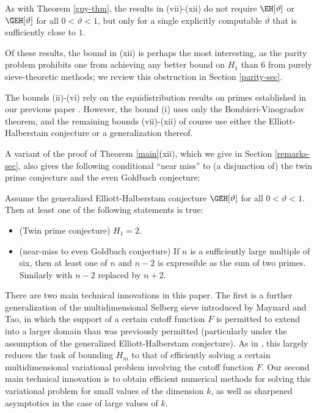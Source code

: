 As with Theorem \ref{gpy-thm}, the results in (vii)-(xii) do not require $\EH[\vartheta]$ or $\GEH[\vartheta]$ for all $0 < \vartheta < 1$, but only for a single explicitly computable $\vartheta$ that is sufficiently close to $1$.

Of these results, the bound in (xii) is perhaps the most interesting, as the parity problem \cite{selberg} prohibits one from achieving any better bound on $H_1$ than $6$ from purely sieve-theoretic methods; we review this obstruction in Section \ref{parity-sec}.

The bounds (ii)-(vi) rely on the equidistribution results on primes established in our previous paper \cite{polymath8a}.  However, the bound (i) uses only the Bombieri-Vinogradov theorem, and the remaining bounds (vii)-(xii) of course use either the Elliott-Halberstam conjecture or a generalization thereof.

A variant of the proof of Theorem \ref{main}(xii), which we give in Section \ref{remarks-sec}, also gives the following conditional ``near miss'' to (a disjunction of) the twin prime conjecture and the even Goldbach conjecture:

\begin{theorem}[Disjunction]\label{disj} Assume the generalized Elliott-Halberstam conjecture $\GEH[\vartheta]$ for all $0 < \vartheta < 1$.  Then at least one of the following statements is true:
\begin{itemize}
\item[(a)]  (Twin prime conjecture) $H_1=2$.
\item[(b)]  (near-miss to even Goldbach conjecture)  If $n$ is a sufficiently large multiple of six, then at least one of $n$ and $n-2$ is expressible as the sum of two primes.  Similarly with $n-2$ replaced by $n+2$.
\end{itemize}
\end{theorem}

There are two main technical innovations in this paper.  The first is a further generalization of the multidimensional Selberg sieve introduced by Maynard and Tao, in which the support of a certain cutoff function $F$ is permitted to extend into a larger domain than was previously permitted (particularly under the assumption of the generalized Elliott-Halberstam conjecture).  As in \cite{maynard}, this largely reduces the task of bounding $H_m$ to that of efficiently solving a certain multidimensional variational problem involving the cutoff function $F$.  Our second main technical innovation is to obtain efficient numerical methods for solving this variational problem for small values of the dimension $k$, as well as sharpened asymptotics in the case of large values of $k$.

